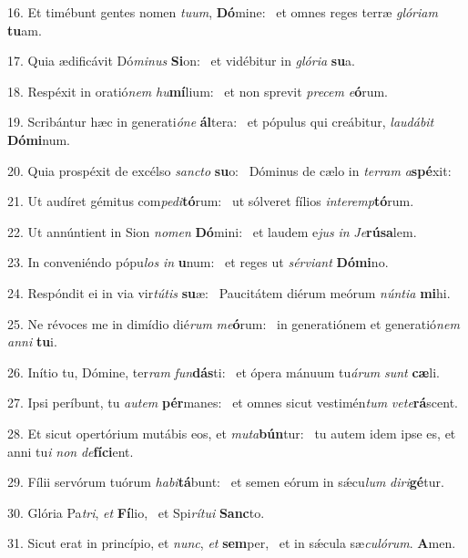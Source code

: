 16. Et timébunt gentes nomen \textit{tu}\textit{um}, \textbf{Dó}mine: \ast\  et omnes reges terræ \textit{gló}\textit{ri}\textit{am} \textbf{tu}am.\

17. Quia ædificávit Dó\textit{mi}\textit{nus} \textbf{Si}on: \ast\  et vidébitur in \textit{gló}\textit{ri}\textit{a} \textbf{su}a.\

18. Respéxit in oratió\textit{nem} \textit{hu}\textbf{mí}lium: \ast\  et non sprevit \textit{pre}\textit{cem} \textit{e}\textbf{ó}rum.\

19. Scribántur hæc in generati\textit{ó}\textit{ne} \textbf{ál}tera: \ast\  et pópulus qui creábitur, \textit{lau}\textit{dá}\textit{bit} \textbf{Dó}\textbf{mi}num.\

20. Quia prospéxit de excélso \textit{sanc}\textit{to} \textbf{su}o: \ast\  Dóminus de cælo in \textit{ter}\textit{ram} \textit{a}\textbf{spé}xit:\

21. Ut audíret gémitus com\textit{pe}\textit{di}\textbf{tó}rum: \ast\  ut sólveret fílios \textit{in}\textit{ter}\textit{emp}\textbf{tó}rum.\

22. Ut annúntient in Sion \textit{no}\textit{men} \textbf{Dó}mini: \ast\  et laudem e\textit{jus} \textit{in} \textit{Je}\textbf{rú}\textbf{sa}lem.\

23. In conveniéndo pópu\textit{los} \textit{in} \textbf{u}num: \ast\  et reges ut \textit{sér}\textit{vi}\textit{ant} \textbf{Dó}\textbf{mi}no.\

24. Respóndit ei in via vir\textit{tú}\textit{tis} \textbf{su}æ: \ast\  Paucitátem diérum meórum \textit{nún}\textit{ti}\textit{a} \textbf{mi}hi.\

25. Ne révoces me in dimídio dié\textit{rum} \textit{me}\textbf{ó}rum: \ast\  in generatiónem et generatió\textit{nem} \textit{an}\textit{ni} \textbf{tu}i.\

26. Inítio tu, Dómine, ter\textit{ram} \textit{fun}\textbf{dás}ti: \ast\  et ópera mánuum tu\textit{á}\textit{rum} \textit{sunt} \textbf{cæ}li.\

27. Ipsi períbunt, tu \textit{au}\textit{tem} \textbf{pér}manes: \ast\  et omnes sicut vestimén\textit{tum} \textit{ve}\textit{te}\textbf{rá}scent.\

28. Et sicut opertórium mutábis eos, et \textit{mu}\textit{ta}\textbf{bún}tur: \ast\  tu autem idem ipse es, et anni tu\textit{i} \textit{non} \textit{de}\textbf{fí}\textbf{ci}ent.\

29. Fílii servórum tuórum \textit{ha}\textit{bi}\textbf{tá}bunt: \ast\  et semen eórum in sǽcu\textit{lum} \textit{di}\textit{ri}\textbf{gé}tur.\

30. Glória Pa\textit{tri}, \textit{et} \textbf{Fí}lio, \ast\  et Spi\textit{rí}\textit{tu}\textit{i} \textbf{Sanc}to.\

31. Sicut erat in princípio, et \textit{nunc}, \textit{et} \textbf{sem}per, \ast\  et in sǽcula sæ\textit{cu}\textit{ló}\textit{rum}. \textbf{A}men.\

